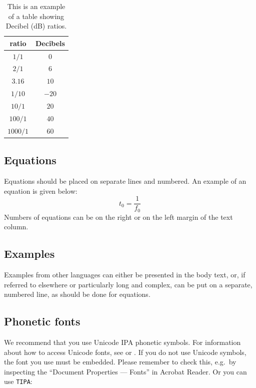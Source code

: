 \documentclass[a4paper,11pt,twocolumn]{article}
\begin{document}
\begin{table}[!ht]
  \caption{This is an example of a table showing Decibel (dB) ratios.}
  \label{tab:decibel}
  \begin{center}
  \begin{tabular}{|c|c|}
  \hline
  \rowcolor[gray]{.75}
  ratio    & Decibels \\
  \hline
  $1/1$    & $0$      \\
  $2/1$    & $6$      \\
  $3.16$   & $10$     \\
  $1/10$   & $-20$    \\
  $10/1$   & $20$     \\
  $100/1$  & $40$     \\
  $1000/1$ & $60$     \\
  \hline
  \end{tabular}
  \end{center}
\end{table}

\subsection{Equations}

Equations should be placed on separate lines and numbered. An example of
an equation is given below: \begin{equation}\label{eq:tzero}
  t_0 = \frac{1}{f_0}
\end{equation} \noindent Numbers of equations can be on the right or on
the left margin of the text column.

\subsection{Examples}

Examples from other languages can either be presented in the body text,
or, if referred to elsewhere or particularly long and complex, can be
put on a separate, numbered line, as should be done for equations.

\subsection{Phonetic fonts}

We recommend that you use Unicode IPA phonetic symbols. For information
about how to access Unicode fonts, see \cite{IPA-SIL} or
\cite{IPA-KEYBOARD}. If you do not use Unicode symbols, the font you use
must be embedded. Please remember to check this, e.g.~by inspecting the
``Document Properties --- Fonts'' in Acrobat Reader. Or you can use
\texttt{TIPA}: 
\end{document}
